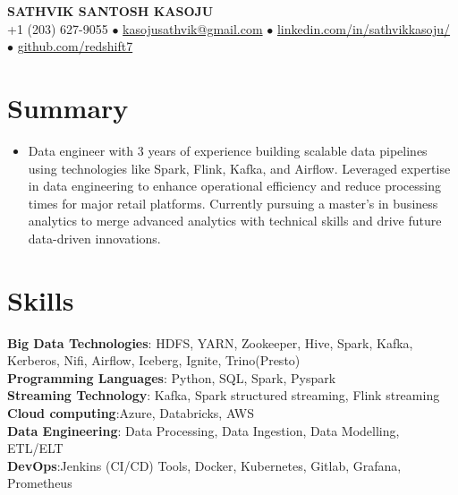 \documentclass[letterpaper,10pt]{article}
\begin{document}
  \begin{center}
      \textbf{\Huge \scshape SATHVIK SANTOSH KASOJU} \\ \vspace{4pt}
      \small  +1 (203) 627-9055 $•$ \href{mailto:kasojusathvik@gmail.com}{{ kasojusathvik@gmail.com}}  $•$   
      \href{https://www.linkedin.com/in/sathvikkasoju/}{linkedin.com/in/sathvikkasoju/} $•$
      \href{https://github.com/redshift7}{github.com/redshift7} 
  \end{center}




  \section{Summary}
  \begin{itemize}[leftmargin=0.15in, label={}]
  \item 
 Data engineer with 3 years of experience building scalable data pipelines using technologies like Spark, Flink, Kafka, and Airflow. Leveraged expertise in data engineering to enhance operational efficiency and reduce processing times for major retail platforms. Currently pursuing a master’s in business analytics to merge advanced analytics with technical skills and drive future data-driven innovations.
  \end{itemize}

  \section{Skills}
   \begin{itemize}[leftmargin=0.15in, label={}]
      \small{\item{
       \textbf{Big Data Technologies}{:\hspace{0.49cm}     HDFS, YARN, Zookeeper, Hive, Spark, Kafka, Kerberos, Nifi, Airflow, Iceberg, Ignite, Trino(Presto)    } \\
       \textbf{Programming Languages}{:\hspace{0.09cm}   Python, SQL, Spark, Pyspark} \\
       \textbf{Streaming Technology}{:\hspace{0.51cm} Kafka, Spark structured streaming, Flink streaming} \\
       \textbf{Cloud computing}{:\hspace{1.45cm}Azure, Databricks, AWS } \\
       \textbf{Data Engineering}{:\hspace{1.25cm} Data Processing, Data Ingestion, Data Modelling, ETL/ELT }\\
       \textbf{DevOps}{:\hspace{2.98cm}Jenkins (CI/CD) Tools, Docker, Kubernetes, Gitlab, Grafana, Prometheus} \\
       
       
      }}
   \end{itemize}
\end{document}
